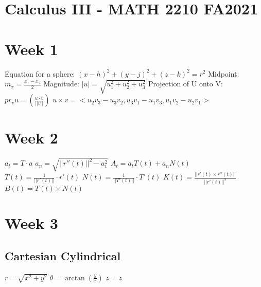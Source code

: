 \documentclass[11pt]{article}
\begin{document}
    \section*{Calculus III - MATH 2210 FA2021}
    \begin{paracol}{2}
        \section{Week 1}
        Equation for a sphere: $(x-h)^2+(y-j)^2+(z-k)^2=r^2$
        Midpoint: $m_x=\frac{x_1-x_2}{2}$\newline
        Magnitude: $|u| = \sqrt{u_1^2 + u_2^2 + u_3^2}$ \newline
        Projection of U onto V: \newline
        $pr_{v}u=( \frac{u \cdot v}{||v||} )$
        \newline
        $u \times v = <u_2 v_3 - u_3 v_2, u_3 v_1 - u_1 v_3 , u_1 v_2 - u_2 v_1 >$ \newline


        \section{Week 2}
        $a_t = T \cdot a$ \newline
        $a_n = \sqrt{||r''(t)||^2 - a_t^2}$ \newline
        $A_t = a_t T(t) + a_n N(t)$ \newline
        $T(t) = \frac{1}{||r'(t)||} \cdot r'(t)$ \newline
        $N(t) = \frac{1}{||T'(t)||} \cdot T'(t)$ \newline
        $K(t) = \frac{||r'(t) \times r''(t)||}{||r'(t)||^3}$ \newline
        $B(t) = T(t) \times N(t)$ \newline


        \section{Week 3}

        \subsection{Cartesian \guillemotright Cylindrical}
        $r = \sqrt{x^2+y^2}$ \newline
        $\theta = \arctan(\frac{y}{x})$ \newline
        $z=z$


\end{paracol}
\end{document}

